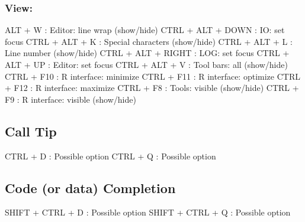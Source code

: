 \subsubsection{View:}

\vspace{-0.5cm}
\begin{Rtables}[caption={[View menu keyboard shortcuts]
    View menu keyboard shortcuts},
  label=menu:view]
  ALT  + W                : Editor: line wrap (show/hide)
  CTRL + ALT + DOWN       : IO: set focus
  CTRL + ALT + K          : Special characters (show/hide)
  CTRL + ALT + L          : Line number (show/hide)
  CTRL + ALT + RIGHT      : LOG: set focus
  CTRL + ALT + UP         : Editor: set focus
  CTRL + ALT + V          : Tool bars: all (show/hide)
  CTRL + F10              : R interface: minimize
  CTRL + F11              : R interface: optimize
  CTRL + F12              : R interface: maximize
  CTRL + F8               : Tools: visible (show/hide)
  CTRL + F9               : R interface: visible (show/hide)
\end{Rtables}


\hypertarget{basic_card_calltip}{}
\subsection{Call Tip}

\vspace{-0.5cm}
\begin{Rtables}[caption={[Call tip keyboard shortcuts]
    Call tip keyboard shortcuts},
  label=shortcut:calltip]
  CTRL + D                : Possible option
  CTRL + Q                : Possible option
\end{Rtables}


\hypertarget{basic_card_codecompletion}{}
\subsection{Code (or data) Completion}

\vspace{-0.5cm}
\begin{Rtables}[caption={[Code completion keyboard shortcuts]
    Code completion keyboard shortcuts},
  label=shortcut:codecompletion]
  SHIFT + CTRL + D        : Possible option
  SHIFT + CTRL + Q        : Possible option
\end{Rtables}


